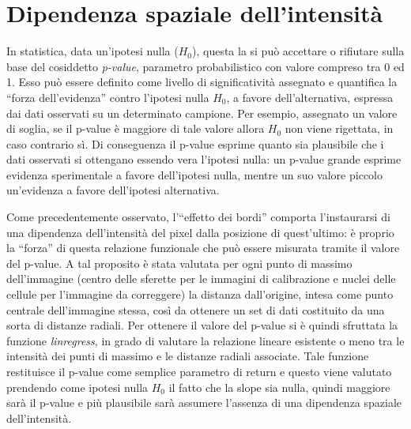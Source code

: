 \section{Dipendenza spaziale dell'intensità}

In statistica, data un'ipotesi nulla ($H_0$), questa la si può accettare o rifiutare sulla base del cosiddetto \textit{p-value}, parametro probabilistico con valore compreso tra 0 ed 1.
Esso può essere definito come livello di significatività assegnato e quantifica la ``forza dell'evidenza'' contro l'ipotesi nulla $H_0$, a favore dell'alternativa, espressa dai dati osservati su un determinato campione. 
Per esempio, assegnato un valore di soglia, se il p-value è maggiore di tale valore allora $H_0$ non viene rigettata, in caso contrario sì.
Di conseguenza il p-value esprime quanto sia plausibile che i dati osservati si ottengano essendo vera l’ipotesi nulla: un p-value grande esprime evidenza sperimentale a favore dell'ipotesi nulla, mentre un suo valore piccolo un'evidenza a favore dell'ipotesi alternativa.

Come precedentemente osservato, l'``effetto dei bordi'' comporta l'instaurarsi di una dipendenza dell'intensità del pixel dalla posizione di quest'ultimo: è proprio la ``forza'' di questa relazione funzionale che può essere misurata tramite il valore del p-value.
A tal proposito è stata valutata per ogni punto di massimo dell'immagine (centro delle sferette per le immagini di calibrazione e nuclei delle cellule per l'immagine da correggere) la distanza dall'origine, intesa come punto centrale dell'immagine stessa, così da ottenere un set di dati costituito da una sorta di distanze radiali. 
Per ottenere il valore del p-value si è quindi sfruttata la funzione \textit{linregress}, in grado di valutare la relazione lineare esistente o meno tra le intensità dei punti di massimo e le distanze radiali associate.
Tale funzione restituisce il p-value come semplice parametro di return e questo viene valutato prendendo come ipotesi nulla $H_0$ il fatto che la slope sia nulla, quindi maggiore sarà il p-value e più plausibile sarà assumere l'assenza di una dipendenza spaziale dell'intensità.

